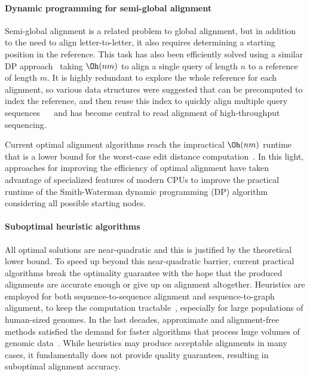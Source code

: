 \paragraph{Dynamic programming for semi-global alignment}
Semi-global alignment is a related problem to global alignment, but in addition
to the need to align letter-to-letter, it also requires determining a starting
position in the reference. This task has also been efficiently solved using a
similar DP approach~\cite{sellers1980theory,smith1981identification} taking
$\Oh(nm)$ to align a single query of length $n$ to a reference of length $m$. It
is highly redundant to explore the whole reference for each alignment, so
various data structures were suggested that can be precomputed to index the
reference, and then reuse this index to quickly align multiple query sequences
~\citeyear{pearson1988improved}~\cite{pearson1988improved} and has become
central to read alignment of high-throughput sequencing.

Current optimal alignment algorithms reach the impractical $\Oh(nm)$ runtime
that is a lower bound for the worst-case edit distance
computation~\cite{backurs2015edit}. In this light, approaches for improving the
efficiency of optimal alignment have taken advantage of specialized features of
modern CPUs to improve the practical runtime of the Smith-Waterman dynamic
programming (DP) algorithm~\cite{smith_comparison_1981} considering all possible
starting nodes.

\paragraph{Suboptimal heuristic algorithms}
All optimal solutions are near-quadratic and this is justified by the
theoretical lower bound. To speed up beyond this near-quadratic barrier, current
practical algorithms break the optimality guarantee with the hope that the
produced alignments are accurate enough or give up on alignment altogether.
Heuristics are employed for both sequence-to-sequence alignment and
sequence-to-graph alignment, to keep the computation
tractable~\cite{altschul_basic_1990,langmead_fast_2012,garrison_variation_2018},
especially for large populations of human-sized genomes. In the last decades,
approximate and alignment-free methods satisfied the demand for faster
algorithms that process huge volumes of genomic
data~\cite{kucherov2019evolution}. While heuristics may produce acceptable
alignments in many cases, it fundamentally does not provide quality guarantees,
resulting in suboptimal alignment accuracy.

